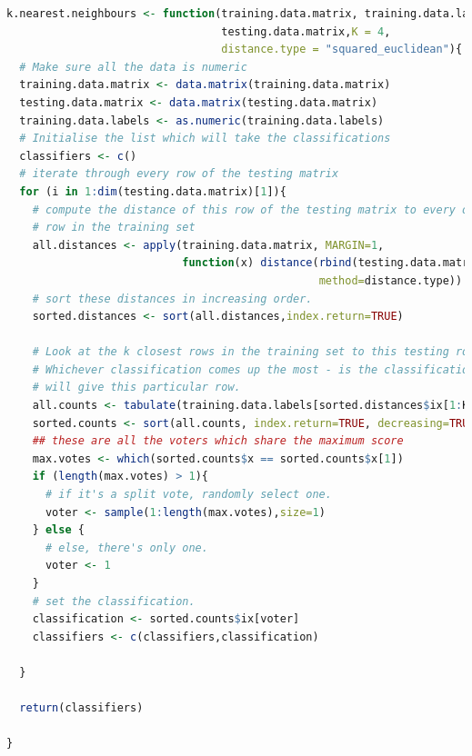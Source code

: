 \documentclass[12pt]{article}
\begin{document}
\begin{lstlisting}[linewidth=18.4cm,language=R]
k.nearest.neighbours <- function(training.data.matrix, training.data.labels, 
                                 testing.data.matrix,K = 4, 
                                 distance.type = "squared_euclidean"){
  # Make sure all the data is numeric
  training.data.matrix <- data.matrix(training.data.matrix)
  testing.data.matrix <- data.matrix(testing.data.matrix)
  training.data.labels <- as.numeric(training.data.labels)
  # Initialise the list which will take the classifications
  classifiers <- c()
  # iterate through every row of the testing matrix
  for (i in 1:dim(testing.data.matrix)[1]){
    # compute the distance of this row of the testing matrix to every other 
    # row in the training set
    all.distances <- apply(training.data.matrix, MARGIN=1, 
                           function(x) distance(rbind(testing.data.matrix[i,],x), 
                                                method=distance.type))
    # sort these distances in increasing order.
    sorted.distances <- sort(all.distances,index.return=TRUE)
    
    # Look at the k closest rows in the training set to this testing row. 
    # Whichever classification comes up the most - is the classification we 
    # will give this particular row.
    all.counts <- tabulate(training.data.labels[sorted.distances$ix[1:K]])
    sorted.counts <- sort(all.counts, index.return=TRUE, decreasing=TRUE)
    ## these are all the voters which share the maximum score
    max.votes <- which(sorted.counts$x == sorted.counts$x[1])
    if (length(max.votes) > 1){
      # if it's a split vote, randomly select one.
      voter <- sample(1:length(max.votes),size=1)
    } else {
      # else, there's only one.
      voter <- 1
    }
    # set the classification.
    classification <- sorted.counts$ix[voter]
    classifiers <- c(classifiers,classification)

  }
  
  return(classifiers)
  
}

\end{lstlisting}
\end{document}
